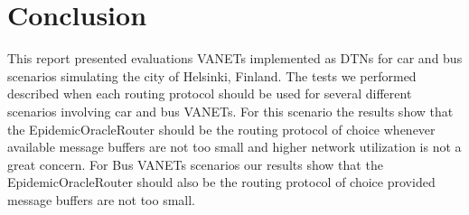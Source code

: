 \section{Conclusion}

This report presented evaluations VANETs implemented as DTNs for car and bus
scenarios simulating the city of Helsinki, Finland.  The tests we performed
described when each routing protocol should be used for several different
scenarios involving car and bus VANETs. For this scenario the results show that
the EpidemicOracleRouter should be the routing protocol of choice whenever
available message buffers are not too small and higher network utilization is
not a great concern.  For Bus VANETs scenarios our results show that the
EpidemicOracleRouter should also be the routing protocol of choice provided
message buffers are not too small.
